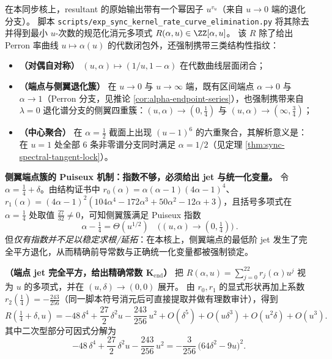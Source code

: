 \begin{remark}[消元曲线的对偶对称、端点奇异簇与 \texorpdfstring{$\alpha=\tfrac12$}{alpha=1/2} 聚合指纹]\label{rem:rate-algebraic-elimination-structure}
在本同步核上，resultant 的原始输出带有一个幂因子 \(u^{v_u}\)（来自 \(u\to 0\) 端的退化分支）。
脚本 \texttt{scripts/exp\_sync\_kernel\_rate\_curve\_elimination.py} 将其除去并得到最小 \(u\)-次数的规范化消元多项式 \(R(\alpha,u)\in\ZZ[\alpha,u]\)。
该 \(R\) 除了给出 Perron 率曲线 \(u\mapsto \alpha(u)\) 的代数闭包外，还强制携带三类结构性指纹：
\begin{itemize}
  \item \textbf{（对偶自对称）} \((u,\alpha)\mapsto(1/u,1-\alpha)\) 在代数曲线层面闭合；
  \item \textbf{（端点与侧翼退化簇）} 在 \(u\to 0\) 与 \(u\to\infty\) 端，既有区间端点 \(\alpha\to0\) 与 \(\alpha\to1\)（Perron 分支，见推论 \ref{cor:alpha-endpoint-series}），也强制携带来自 \(\lambda=0\) 退化谱分支的侧翼四重簇：\((u,\alpha)\to(0,\tfrac14)\) 与 \((u,\alpha)\to(\infty,\tfrac34)\)；
  \item \textbf{（中心聚合）} 在 \(\alpha=\tfrac12\) 截面上出现 \((u-1)^6\) 的六重聚合，其解析意义是：在 \(u=1\) 处全部 \(6\) 条非零谱分支同时满足 \(\alpha=1/2\)（见定理 \ref{thm:sync-spectral-tangent-lock}）。
\end{itemize}
\par
\noindent\textbf{侧翼端点簇的 Puiseux 机制：指数不够，必须给出 jet 与统一化变量。}
令 \(\alpha=\tfrac14+\delta\)。由结构证书中
\(
r_0(\alpha)=\alpha(\alpha-1)(4\alpha-1)^4
\)、
\(
r_1(\alpha)=(4\alpha-1)^2(104\alpha^4-172\alpha^3+50\alpha^2-12\alpha+3)
\)，且括号多项式在 \(\alpha=\tfrac14\) 处取值 \(\tfrac{27}{32}\neq0\)，可知侧翼簇满足 Puiseux 指数
\[
\boxed{\ \alpha-\tfrac14=\Theta(u^{1/2})\quad\bigl((u,\alpha)\to(0,\tfrac14)\bigr)\ }.
\]
但\emph{仅有指数并不足以稳定求根/延拓}：在本核上，侧翼端点的最低阶 jet 发生了完全平方退化，从而精确前导常数与正确统一化变量都被强制锁定。
\par
\noindent\textbf{（端点 jet 完全平方，给出精确常数 \(\boldsymbol{K_{\mathrm{end}}}\)）}
把 \(R(\alpha,u)=\sum_{j=0}^{22}r_j(\alpha)u^j\) 视为 \(u\) 的多项式，并在 \((u,\delta)\to(0,0)\) 展开。
由 \(r_0,r_1\) 的显式形状再加上系数 \(r_2(\tfrac14)=-\tfrac{243}{256}\)（同一脚本符号消元后可直接提取并做有理数审计），得到
\[
R\!\left(\tfrac14+\delta,u\right)
=-48\,\delta^4+\frac{27}{2}\,\delta^2u-\frac{243}{256}\,u^2
+O(\delta^5)+O(u\delta^3)+O(u^2\delta)+O(u^3).
\]
其中二次型部分可因式分解为
\[
-48\,\delta^4+\frac{27}{2}\,\delta^2u-\frac{243}{256}\,u^2
=-\frac{3}{256}\,\bigl(64\delta^2-9u\bigr)^2.
\]
\end{remark}
